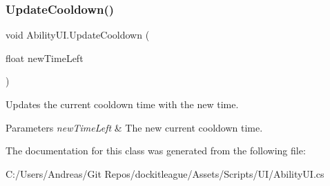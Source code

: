 \subsubsection{\texorpdfstring{Update\+Cooldown()}{UpdateCooldown()}}
{\footnotesize\ttfamily void Ability\+U\+I.\+Update\+Cooldown (\begin{DoxyParamCaption}\item[{float}]{new\+Time\+Left }\end{DoxyParamCaption})}



Updates the current cooldown time with the new time. 


\begin{DoxyParams}{Parameters}
{\em new\+Time\+Left} & The new current cooldown time.\\
\hline
\end{DoxyParams}


The documentation for this class was generated from the following file\+:\begin{DoxyCompactItemize}
\item 
C\+:/\+Users/\+Andreas/\+Git Repos/dockitleague/\+Assets/\+Scripts/\+U\+I/Ability\+U\+I.\+cs\end{DoxyCompactItemize}
